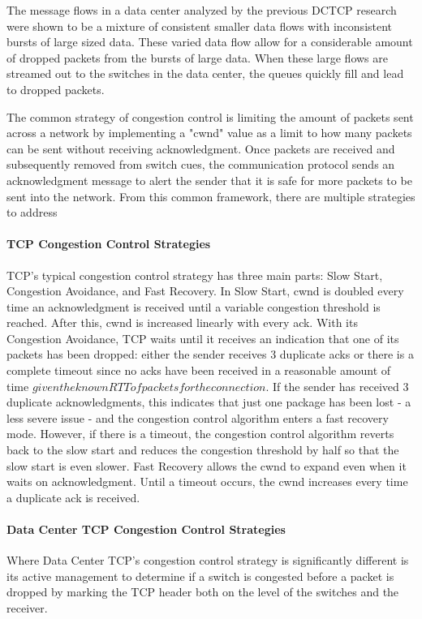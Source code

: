 \documentclass[%
 reprint,
amsmath,amssymb,
aps,
]{revtex4-2}
\begin{document}
The message flows in a data center analyzed by the previous DCTCP research were shown to be a mixture of consistent smaller data flows with inconsistent bursts of large sized data. These varied data flow allow for a considerable amount of dropped packets from the bursts of large data. When these large flows are streamed out to the switches in the data center, the queues quickly fill and lead to dropped packets.

The common strategy of congestion control is limiting the amount of packets sent across a network by implementing a "cwnd" value as a limit to how many packets can be sent without receiving acknowledgment. Once packets are received and subsequently removed from switch cues, the communication protocol sends an acknowledgment message to alert the sender that it is safe for more packets to be sent into the network. From this common framework, there are multiple strategies to address  

\paragraph{TCP Congestion Control Strategies}
TCP's typical congestion control strategy has three main parts: Slow Start, Congestion Avoidance, and Fast Recovery. 
In Slow Start, cwnd is doubled every time an acknowledgment is received until a variable congestion threshold is reached. After this, cwnd is increased linearly with every ack. 
With its Congestion Avoidance, TCP waits until it receives an indication that one of its packets has been dropped: either the sender receives 3 duplicate acks or there is a complete timeout since no acks have been received in a reasonable amount of time \(given the known RTT of packets for the connection\). If the sender has received 3 duplicate acknowledgments, this indicates that just one package has been lost - a less severe issue - and the congestion control algorithm enters a fast recovery mode. However, if there is a timeout, the congestion control algorithm reverts back to the slow start and reduces the congestion threshold by half so that the slow start is even slower.
Fast Recovery allows the cwnd to expand even when it waits on acknowledgment. Until a timeout occurs, the cwnd increases every time a duplicate ack is received.

\paragraph{Data Center TCP Congestion Control Strategies}
Where Data Center TCP's congestion control strategy is significantly different is its active management to determine if a switch is congested before a packet is dropped by marking the TCP header both on the level of the switches and the receiver.
\end{document}
